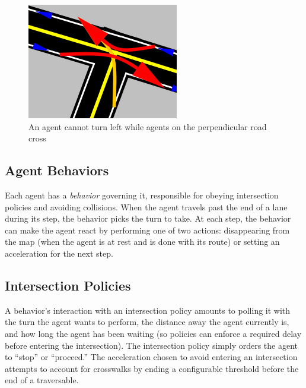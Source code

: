 \documentclass[letterpaper, 10 pt, conference]{ieeeconf}  %
\begin{document}

\begin{figure}[h]
  \centering \includegraphics[scale=0.5]{turn_conflicts.png}
  \caption{An agent cannot turn left while agents on the perpendicular road cross}
  \label{fig:conflicts}
  \vspace{-15pt}
\end{figure}

\subsection{Agent Behaviors}


Each agent has a \emph{behavior} governing it, responsible for obeying
intersection policies and avoiding collisions. When the agent travels past the
end of a lane during its step, the behavior picks the turn to take. At each
step, the behavior can make the agent react by performing one of two actions:
disappearing from the map (when the agent is at rest and is done with its route)
or setting an acceleration for the next step.

\subsection{Intersection Policies}

A behavior's interaction with an intersection policy amounts to polling it with
the turn the agent wants to perform, the distance away the agent currently is,
and how long the agent has been waiting (so policies can enforce a required
delay before entering the intersection). The intersection policy simply orders
the agent to ``stop'' or ``proceed.''  The acceleration chosen to
avoid entering an intersection attempts to account for crosswalks by ending a
configurable threshold before the end of a traversable.
\end{document}
